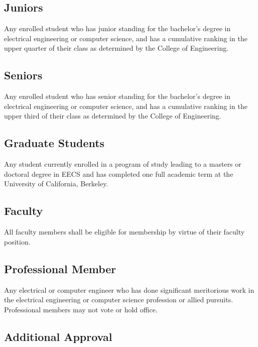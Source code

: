 \documentclass[11pt]{article}
\begin{document}
\subsection{Juniors}
\label{sec:org7f577d2}

Any enrolled student who has junior standing for the bachelor’s degree in electrical engineering or computer science, and has a cumulative ranking in the upper quarter of their class as determined by the College of Engineering.

\subsection{Seniors}
\label{sec:orgc7ecc6a}

Any enrolled student who has senior standing for the bachelor’s degree in electrical engineering or computer science, and has a cumulative ranking in the upper third of their class as determined by the College of Engineering.

\subsection{Graduate Students}
\label{sec:orgfd39e98}

Any student currently enrolled in a program of study leading to a masters or doctoral degree in EECS and has completed one full academic term at the University of California, Berkeley.

\subsection{Faculty}
\label{sec:orgb44c143}

All faculty members shall be eligible for membership by virtue of their faculty position.

\subsection{Professional Member}
\label{sec:org8dac84a}

Any electrical or computer engineer who has done significant meritorious work in the electrical engineering or computer science profession or allied pursuits.
Professional members may not vote or hold office.

\subsection{Additional Approval}
\label{sec:org22b4876}
\end{document}
